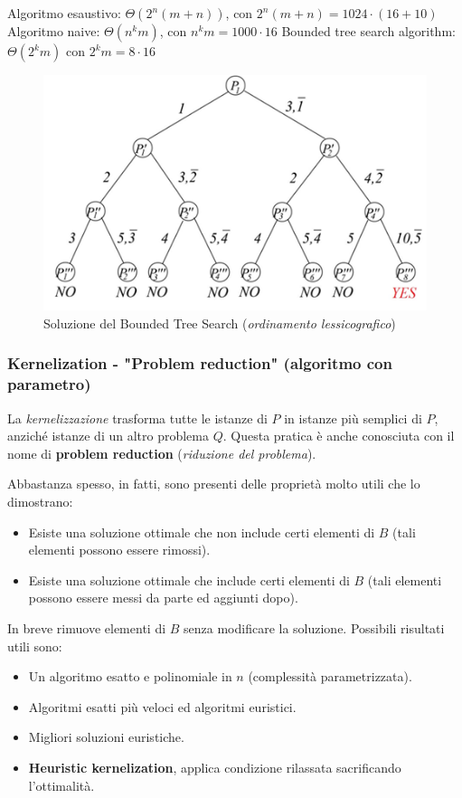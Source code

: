 \documentclass{article}
\begin{document}
\noindent Algoritmo esaustivo: $\Theta(2^n(m+n))$, con $2^n(m+n)=1024\cdot(16+10)$\newline
Algoritmo naive: $\Theta(n^k m)$, con $n^k m=1000\cdot 16$\newline
Bounded tree search algorithm: $\Theta(2^km)$ con $2^km=8\cdot 16$

\begin{figure}[H]
    \centering
    \includegraphics[scale=0.8]{images/bounded_tree_search_2.png}
    \caption{Soluzione del Bounded Tree Search (\textit{ordinamento lessicografico})}
\end{figure}

\subsubsection{Kernelization - "Problem reduction" (algoritmo con parametro)}
La \textit{kernelizzazione} trasforma tutte le istanze di $P$ in istanze più
semplici di $P$, anziché istanze di un altro problema $Q$. Questa pratica è anche
conosciuta con il nome di \textbf{problem reduction} (\textit{riduzione del problema}).

Abbastanza spesso, in fatti, sono presenti delle proprietà molto utili che lo dimostrano:
\begin{itemize}
    \item Esiste una soluzione ottimale che non include certi elementi di $B$ (tali
          elementi possono essere rimossi).
    \item Esiste una soluzione ottimale che include certi elementi di $B$ (tali
          elementi possono essere messi da parte ed aggiunti dopo).
\end{itemize}
In breve rimuove elementi di $B$ senza modificare la soluzione. Possibili risultati
utili sono:
\begin{itemize}
    \item Un algoritmo esatto e polinomiale in $n$ (complessità parametrizzata).
    \item Algoritmi esatti più veloci ed algoritmi euristici.
    \item Migliori soluzioni euristiche.
    \item \textbf{Heuristic kernelization}, applica condizione rilassata sacrificando
          l'ottimalità.
\end{itemize}
\end{document}
